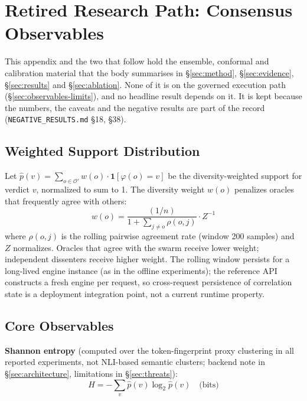 \documentclass[10pt,twocolumn]{article}
\newcommand{\OraclesV}{\mathcal{O}'}
\begin{document}
\section{Retired Research Path: Consensus Observables}
\label{app:consensus}

This appendix and the two that follow hold the ensemble, conformal and
calibration material that the body summarises in
\S\ref{sec:method}, \S\ref{sec:evidence}, \S\ref{sec:results} and
\S\ref{sec:ablation}. None of it is on the governed execution path
(\S\ref{sec:observables-limits}), and no headline result depends on it.
It is kept because the numbers, the caveats and the negative results are
part of the record (\texttt{NEGATIVE\_RESULTS.md} \S18, \S38).

\subsection{Weighted Support Distribution}

Let $\hat{p}(v) = \sum_{o \in \OraclesV} w(o) \cdot
\mathbf{1}[\varphi(o)=v]$ be the diversity-weighted support for
verdict $v$, normalized to sum to 1. The diversity weight $w(o)$
penalizes oracles that frequently agree with others:
%
\begin{equation}
  w(o) = \frac{(1/n)}{1 + \sum_{j \neq o} \rho(o,j)} \cdot Z^{-1}
\end{equation}
%
where $\rho(o,j)$ is the rolling pairwise agreement rate (window 200
samples) and $Z$ normalizes. Oracles that agree with the swarm receive
lower weight; independent dissenters receive higher weight.
The rolling window persists for a long-lived engine instance (as in the
offline experiments); the reference API constructs a fresh engine per
request, so cross-request persistence of correlation state is a
deployment integration point, not a current runtime property.

\subsection{Core Observables}

\textbf{Shannon entropy} (computed over the token-fingerprint proxy
clustering in all reported experiments, not NLI-based semantic
clusters; backend note in \S\ref{sec:architecture}, limitations in
\S\ref{sec:threats}):
\begin{equation}
  H = -\sum_v \hat{p}(v) \log_2 \hat{p}(v) \quad \text{(bits)}
\end{equation}
\end{document}
